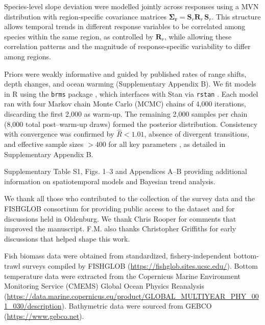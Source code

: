\documentclass[pdflatex,sn-nature,referee]{sn-jnl}%
\begin{document}
Species-level slope deviation were modelled jointly across responses using a MVN distribution with region-specific covariance matrices $\boldsymbol{\Sigma_r} = \mathbf{S}_{r}\mathbf{R}_{r}\,\mathbf{S}_{r}$. This structure allows temporal trends in different response variables to be correlated among species within the same region, as controlled by $\mathbf{R}_{r}$, while allowing these correlation patterns and the magnitude of response-specific variability to differ among regions.

Priors were weakly informative and guided by published rates of range shifts, depth changes, and ocean warming (Supplementary Appendix B). We fit models in R using the \texttt{brms} package \citep{burkner_brms_2017}, which interfaces with Stan via \texttt{rstan} \citep{stan2024,stan_development_team_rstan_2024}. Each model ran with four Markov chain Monte Carlo (MCMC) chains of 4,000 iterations, discarding the first 2,000 as warm-up. The remaining 2,000 samples per chain (8,000 total post–warm-up draws) formed the posterior distribution. Consistency with convergence was confirmed by $\hat{R} < 1.01$, absence of divergent transitions, and effective sample sizes $> 400$ for all key parameters \citep{vehtari_rank-normalization_2021}, as detailed in Supplementary Appendix B.



\backmatter

Supplementary Table S1, Figs. 1–3 and Appendices A–B providing additional information on spatiotemporal models and Bayesian trend analysis.

We thank all those who contributed to the collection of the survey data and the FISHGLOB consortium for providing public access to the dataset and for discussions held in Oldenburg. We thank Chris Rooper for comments that improved the manuscript. F.M. also thanks Christopher Griffiths for early discussions that helped shape this work.

Fish biomass data were obtained from standardized, fishery-independent bottom-trawl surveys compiled by FISHGLOB (\url{https://fishglob.sites.ucsc.edu/}). Bottom temperature data were extracted from the Copernicus Marine Environment Monitoring Service (CMEMS) Global Ocean Physics Reanalysis (\url{https://data.marine.copernicus.eu/product/GLOBAL_MULTIYEAR_PHY_001_030/description}). Bathymetric data were sourced from GEBCO (\url{https://www.gebco.net}).
\end{document}
